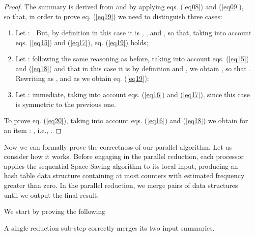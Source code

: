 \documentclass[final,3p,times]{elsarticle}
\begin{document}
\begin{proof}


The summary  is derived from  and  by applying eqs. (\ref{eq08}) and (\ref{eq09}), so that, in order to prove eq. (\ref{eq19}) we need to distinguish three cases:

\begin{enumerate}
  \item Let : . But, by definition in this case it is , , 
        and , so that, taking into account eqs. (\ref{eq15}) and (\ref{eq17}), eq. (\ref{eq19}) holds;
  
  \item Let : following the same reasoning as before, taking into account eqs. (\ref{eq15}) and (\ref{eq18}) and that in this case it is by definition  and , we obtain , so that . Rewriting  as , and  as  we obtain eq. (\ref{eq19});

  \item Let : immediate, taking into account eqs. (\ref{eq16}) and (\ref{eq17}), since this case is symmetric to the previous one.
\end{enumerate}

To prove eq. (\ref{eq20}), taking into account eqs. (\ref{eq16}) and (\ref{eq18}) we obtain for an item : , i.e., .

\end{proof}



Now we can formally prove the correctness of our parallel algorithm. Let us consider how it works. Before engaging in the parallel reduction, each processor applies the sequential Space Saving algorithm to its local input, producing an hash table data structure containing at most  counters with estimated frequency greater than zero. In the parallel reduction, we merge pairs of data structures until we output the final result. 

We start by proving the following

\begin{thm}
\label{pr-single-step}
A single reduction sub-step correctly merges its two input summaries.
\end{thm}
\end{document}
